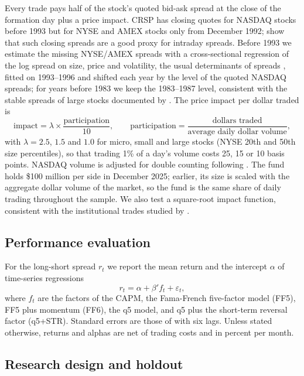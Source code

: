 \documentclass[12pt,a4paper]{article}
\begin{document}
Every trade pays half of the stock's quoted bid-ask spread at the close of the formation day plus a
price impact. CRSP has closing quotes for NASDAQ stocks before 1993 but for NYSE and AMEX stocks only
from December 1992; \citet{ChungZhang2014} show that such closing spreads are a good proxy for
intraday spreads. Before 1993 we estimate the missing NYSE/AMEX spreads with a cross-sectional
regression of the log spread on size, price and volatility, the usual determinants of spreads
\citep{StollWhaley1983,ChenVelikov2023}, fitted on 1993--1996 and shifted each year by the level of
the quoted NASDAQ spreads; for years before 1983 we keep the 1983--1987 level, consistent with the
stable spreads of large stocks documented by \citet{Jones2002}. The price impact per dollar traded is
\begin{equation}
\text{impact} = \lambda \times \frac{\text{participation}}{10}, \qquad
\text{participation} = \frac{\text{dollars traded}}{\text{average daily dollar volume}},
\end{equation}
with $\lambda = 2.5$, $1.5$ and $1.0$ for micro, small and large stocks (NYSE 20th and 50th size
percentiles), so that trading 1\% of a day's volume costs 25, 15 or 10 basis points. NASDAQ volume is
adjusted for double counting following \citet{GaoRitter2010}. The fund holds \$100 million per side
in December 2025; earlier, its size is scaled with the aggregate dollar volume of the market, so the
fund is the same share of daily trading throughout the sample. We also test a square-root impact
function, consistent with the institutional trades studied by \citet{FrazziniIsraelMoskowitz2018}.

\subsection{Performance evaluation}

For the long-short spread $r_t$ we report the mean return and the intercept $\alpha$ of time-series
regressions
\begin{equation}
r_t = \alpha + \beta' f_t + \varepsilon_t ,
\end{equation}
where $f_t$ are the factors of the CAPM, the Fama-French five-factor model (FF5), FF5 plus momentum
(FF6), the q5 model, and q5 plus the short-term reversal factor (q5+STR). Standard errors are those
of \citet{NeweyWest1987} with six lags. Unless stated otherwise, returns and alphas are net of trading
costs and in percent per month.

\subsection{Research design and holdout}
\end{document}
